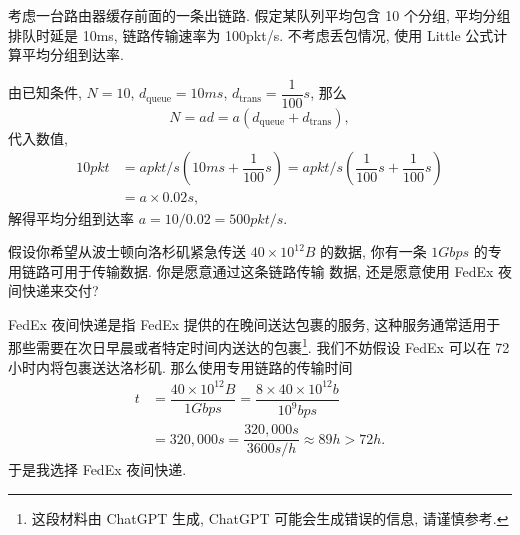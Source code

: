 \documentclass[10pt,UTF8]{book} %
\begin{document}
\begin{example}
    考虑一台路由器缓存前面的一条出链路. 假定某队列平均包含 10 个分组, 
    平均分组排队时延是 10ms, 链路传输速率为 100pkt/s.
    不考虑丢包情况, 使用 Little 公式计算平均分组到达率.
    \begin{sol}
        由已知条件, $N = 10$, $d_\mathrm{queue} = 10\si{ms}$,
        $d_\mathrm{trans} = \dfrac{1}{100} \si{s}$, 那么
        \[ N = a d 
        = a \left( d_\mathrm{queue} + d_\mathrm{trans} \right), \]
        代入数值,
        \[ 
        \begin{aligned}
            10 \si{pkt} 
            &= a \si{pkt/s} \left(
                10\si{ms} + \dfrac{1}{100}\si{s}
            \right) 
            = a \si{pkt/s} \left(
                \dfrac{1}{100} \si{s} + \dfrac{1}{100}\si{s}
            \right) \\ 
            & = a \times 0.02 \si{s},
        \end{aligned} \]
        解得平均分组到达率 $a = 10/0.02 = 500 \si{pkt/s}$.
    \end{sol}
\end{example}

\begin{example}
    假设你希望从波士顿向洛杉矶紧急传送 $40 \times 10^{12} \si{B}$ 的数据,
    你有一条 $1\si{Gbps}$ 的专用链路可用于传输数据. 你是愿意通过这条链路传输
    数据, 还是愿意使用 FedEx 夜间快递来交付?
    \begin{sol}
        FedEx 夜间快递是指 FedEx 提供的在晚间送达包裹的服务,
        这种服务通常适用于那些需要在次日早晨或者特定时间内送达的包裹\footnote{
            这段材料由 ChatGPT 生成, ChatGPT 可能会生成错误的信息, 请谨慎参考.
        }. 
        我们不妨假设 FedEx 可以在 72 小时内将包裹送达洛杉矶.
        那么使用专用链路的传输时间 
        \[ 
        \begin{aligned}
            t &= \dfrac{40 \times 10^{12} \si{B}}{1 \si{Gbps}}
            = \dfrac{8 \times 40 \times 10^{12} \si{b}}{10^9 \si{bps}} \\ 
            &= 320,000 \si{s} = \dfrac{320,000 \si{s}}{3600 \si{s/h}} 
            \approx 89 \si{h} > 72 \si{h}.
        \end{aligned} \]
        于是我选择 FedEx 夜间快递.
    \end{sol}
\end{example}
\end{document}
